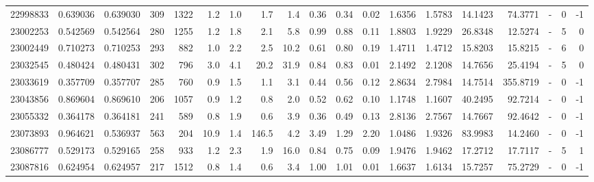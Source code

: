 \begin{tabular}{rrrrrrrrrrrrrrrrlrr}
  22998833 & 0.639036 &   0.639030 &  309 & 1322 &      1.2 &      1.0 &     1.7 &      1.4 &       0.36 &        0.34 &        0.02 &  1.6356 &  1.5783 &   14.1423 &   74.3771 &             - &        0 &         -1 \\
  23002253 & 0.542569 &   0.542564 &  280 & 1255 &      1.2 &      1.8 &     2.1 &      5.8 &       0.99 &        0.88 &        0.11 &  1.8803 &  1.9229 &   26.8348 &   12.5274 &             - &        5 &          0 \\
  23002449 & 0.710273 &   0.710253 &  293 &  882 &      1.0 &      2.2 &     2.5 &     10.2 &       0.61 &        0.80 &        0.19 &  1.4711 &  1.4712 &   15.8203 &   15.8215 &             - &        6 &          0 \\
  23032545 & 0.480424 &   0.480431 &  302 &  796 &      3.0 &      4.1 &    20.2 &     31.9 &       0.84 &        0.83 &        0.01 &  2.1492 &  2.1208 &   14.7656 &   25.4194 &             - &        5 &          0 \\
  23033619 & 0.357709 &   0.357707 &  285 &  760 &      0.9 &      1.5 &     1.1 &      3.1 &       0.44 &        0.56 &        0.12 &  2.8634 &  2.7984 &   14.7514 &  355.8719 &             - &        0 &         -1 \\
  23043856 & 0.869604 &   0.869610 &  206 & 1057 &      0.9 &      1.2 &     0.8 &      2.0 &       0.52 &        0.62 &        0.10 &  1.1748 &  1.1607 &   40.2495 &   92.7214 &             - &        0 &         -1 \\
  23055332 & 0.364178 &   0.364181 &  241 &  589 &      0.8 &      1.9 &     0.6 &      3.9 &       0.36 &        0.49 &        0.13 &  2.8136 &  2.7567 &   14.7667 &   92.4642 &             - &        0 &         -1 \\
  23073893 & 0.964621 &   0.536937 &  563 &  204 &     10.9 &      1.4 &   146.5 &      4.2 &       3.49 &        1.29 &        2.20 &  1.0486 &  1.9326 &   83.9983 &   14.2460 &             - &        0 &         -1 \\
  23086777 & 0.529173 &   0.529165 &  258 &  933 &      1.2 &      2.3 &     1.9 &     16.0 &       0.84 &        0.75 &        0.09 &  1.9476 &  1.9462 &   17.2712 &   17.7117 &             - &        5 &          1 \\
  23087816 & 0.624954 &   0.624957 &  217 & 1512 &      0.8 &      1.4 &     0.6 &      3.4 &       1.00 &        1.01 &        0.01 &  1.6637 &  1.6134 &   15.7257 &   75.2729 &             - &        0 &         -1 \\

\end{tabular}
